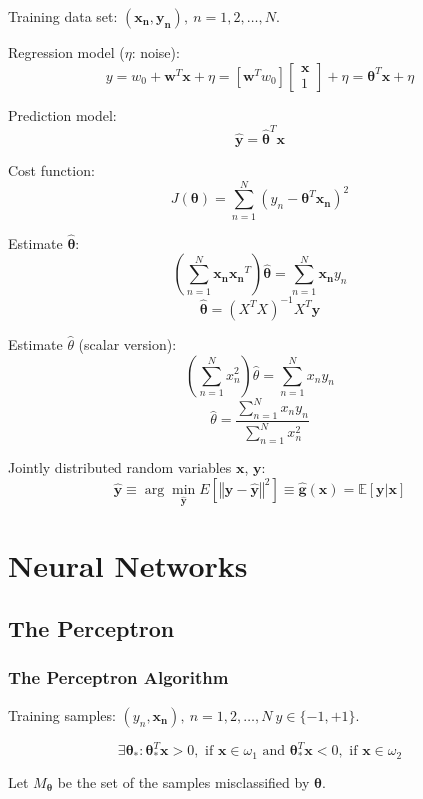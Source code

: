 \documentclass{article}
\begin{document}
\begin{multicols}{2}
Training data set: $(\symbf{x_n}, \symbf{y_n}),\ n=1, 2, \ldots, N$.

Regression model ($\eta$: noise):
\[y = w_0 + \symbf{w}^T \symbf{x} + \eta = [\symbf{w}^T w_0] \begin{bmatrix}\symbf{x} \\
1\end{bmatrix} + \eta = \symbf{\theta}^T \symbf{x} + \eta\]

Prediction model:
\[\symbf{\hat y} = \symbf{\hat \theta}^T \symbf{x}\]

Cost function:
\[J(\symbf{\theta}) = \sum_{n=1}^N (y_n - \symbf{\theta}^T \symbf{x_n})^2 \]

Estimate $\symbf{\hat \theta}$:
\[\left( \sum_{n=1}^N \symbf{x_n}\symbf{x_n}^T \right) \symbf{\hat \theta} = \sum_{n=1}^N \symbf{x_n} y_n\]
\[\symbf{\hat \theta} = (X^T X)^{-1} X^T \symbf{y}\]

Estimate $\hat \theta$ (scalar version):
\[\left( \sum_{n=1}^N x_n^2 \right) \hat \theta = \sum_{n=1}^N x_n y_n\]
\[\hat \theta = \frac{\sum_{n=1}^N x_n y_n}{\sum_{n=1}^N x_n^2}\]

Jointly distributed random variables $\symbf{x}$, $\symbf{y}$:
\[\symbf{\hat y} \equiv \arg\min_{\symbf{\hat y}} E\left[ \left\Vert \symbf{y} - \symbf{\hat y} \right\Vert^2 \right] \equiv \symbf{\hat g}(\symbf{x}) = \mathbb{E}[\symbf{y} | \symbf{x}]\]


\section{Neural Networks}

\subsection{The Perceptron}

\subsubsection*{The Perceptron Algorithm}

Training samples: $(y_n, \symbf{x_n}),\ n=1, 2, \ldots, N\ y \in \{-1, +1\}$.

\[\exists \symbf{\theta}_*: \symbf{\theta}_*^T \symbf{x} > 0,\text{ if }\symbf{x} \in \omega_1\text{ and }\symbf{\theta}_*^T \symbf{x} < 0,\text{ if }\symbf{x} \in \omega_2\]

Let $M_{\symbf{\theta}}$ be the set of the samples misclassified by $\symbf{\theta}$.


\end{multicols}
\end{document}
